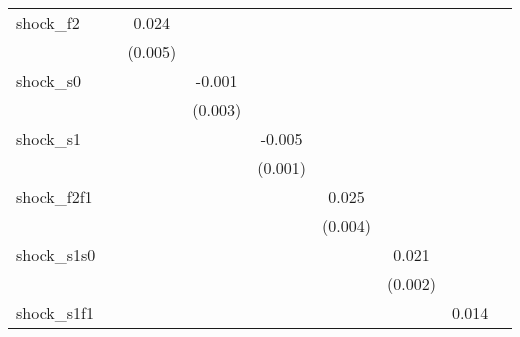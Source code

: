 {\begin{tabular}{l*{8}{c}}
\addlinespace
shock\_f2    &                     &       0.024\sym{***}&                     &                     &                     &                     &                     &                     \\
            &                     &     (0.005)         &                     &                     &                     &                     &                     &                     \\
\addlinespace
shock\_s0    &                     &                     &      -0.001         &                     &                     &                     &                     &                     \\
            &                     &                     &     (0.003)         &                     &                     &                     &                     &                     \\
\addlinespace
shock\_s1    &                     &                     &                     &      -0.005\sym{***}&                     &                     &                     &                     \\
            &                     &                     &                     &     (0.001)         &                     &                     &                     &                     \\
\addlinespace
shock\_f2f1  &                     &                     &                     &                     &       0.025\sym{***}&                     &                     &                     \\
            &                     &                     &                     &                     &     (0.004)         &                     &                     &                     \\
\addlinespace
shock\_s1s0  &                     &                     &                     &                     &                     &       0.021\sym{***}&                     &                     \\
            &                     &                     &                     &                     &                     &     (0.002)         &                     &                     \\
\addlinespace
shock\_s1f1  &                     &                     &                     &                     &                     &                     &       0.014\sym{***}&                     \\

\end{tabular}}
